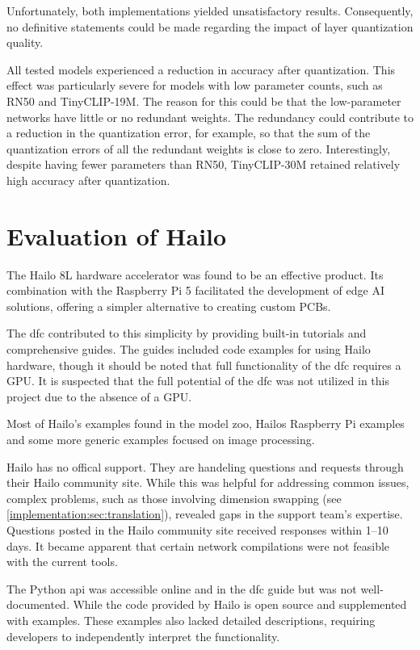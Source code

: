 Unfortunately, both implementations yielded unsatisfactory results.  
Consequently, no definitive statements could be made regarding the impact of layer quantization quality.  

All tested models experienced a reduction in accuracy after quantization.  
This effect was particularly severe for models with low parameter counts, such as RN50 and TinyCLIP-19M.
The reason for this could be that the low-parameter networks have little or no redundant weights.
The redundancy could contribute to a reduction in the quantization error, for example, so that the sum of the quantization errors of all the redundant weights is close to zero.
Interestingly, despite having fewer parameters than RN50, TinyCLIP-30M retained relatively high accuracy after quantization.    

\section{Evaluation of Hailo}  
The Hailo 8L hardware accelerator was found to be an effective product.  
Its combination with the Raspberry Pi 5 facilitated the development of edge AI solutions, offering a simpler alternative to creating custom PCBs.  

The \acrshort{dfc} contributed to this simplicity by providing built-in tutorials and comprehensive guides.  
The guides included code examples for using Hailo hardware, though it should be noted that full functionality of the \acrshort{dfc} requires a GPU.  
It is suspected that the full potential of the \acrshort{dfc} was not utilized in this project due to the absence of a GPU.  

Most of Hailo's examples found in the model zoo\cite{hailo_model_zoo}, Hailos Raspberry Pi examples\cite{hailo_rpi5_examples} and some more generic examples\cite{hailo_application_code_examples} focused on image processing.

Hailo has no offical support.
They are handeling questions and requests through their Hailo community site.  
While this was helpful for addressing common issues, complex problems, such as those involving dimension swapping (see \cref{implementation:sec:translation}), revealed gaps in the support team's expertise.
Questions posted in the Hailo community site received responses within 1–10 days. 
It became apparent that certain network compilations were not feasible with the current tools.  

The Python \acrfull{api} was accessible online and in the \acrshort{dfc} guide but was not well-documented.  
While the code provided by Hailo is open source and supplemented with examples.
These examples also lacked detailed descriptions, requiring developers to independently interpret the functionality.  
 

